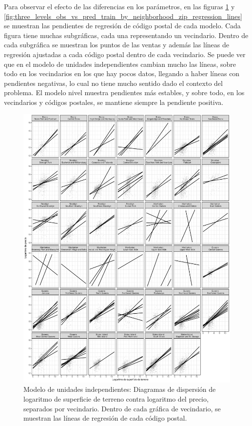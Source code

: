Para observar el efecto de las diferencias en los parámetros, en las figuras \ref{fig:no_pooling_obs_vs_pred_train_by_neighborhood_zip_regression_lines} y \ref{fig:three_levels_obs_vs_pred_train_by_neighborhood_zip_regression_lines} se muestran las pendientes de regresión de código postal de cada modelo. Cada figura tiene muchas subgráficas, cada una representando un vecindario. Dentro de cada subgráfica se muestran los puntos de las ventas y además las líneas de regresión ajustadas a cada código postal dentro de cada vecindario. Se puede ver que en el modelo de unidades independientes cambian mucho las líneas, sobre todo en los vecindarios en los que hay pocos datos, llegando a haber líneas con pendientes negativas, lo cual no tiene mucho sentido dado el contexto del problema. El modelo nivel muestra pendientes más estables, y sobre todo, en los vecindarios y códigos postales, se mantiene siempre la pendiente positiva.

\begin{figure}[H]
    \centering
    \includegraphics[width=\textwidth]{images/no_pooling_obs_vs_pred_train_by_neighborhood_zip_regression_lines.pdf}
    \caption{Modelo de unidades independientes: Diagramas de dispersión de logaritmo de superficie de terreno contra logaritmo del precio, separados por vecindario. Dentro de cada gráfica de vecindario, se muestran las líneas de regresión de cada código postal.}
    \label{fig:no_pooling_obs_vs_pred_train_by_neighborhood_zip_regression_lines}
\end{figure}

